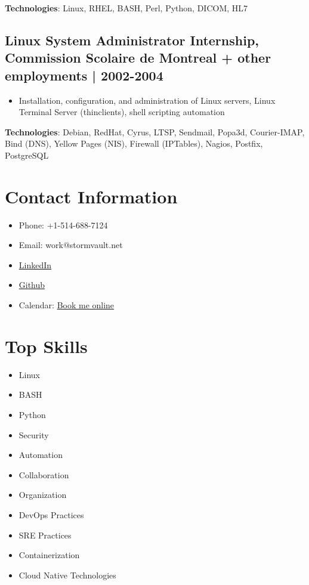 \documentclass[11pt,a4paper]{article}
\begin{document}
\textbf{Technologies}: Linux, RHEL, BASH, Perl, Python, DICOM, HL7
\subsection*{Linux System Administrator Internship, Commission Scolaire de Montreal + other employments | 2002-2004}
\label{sec:orge895621}
\begin{itemize}
\item Installation, configuration, and administration of Linux servers, Linux Terminal Server (thinclients), shell scripting automation
\end{itemize}

\textbf{Technologies}: Debian, RedHat, Cyrus, LTSP, Sendmail, Popa3d, Courier-IMAP, Bind (DNS), Yellow Pages (NIS), Firewall (IPTables), Nagios, Postfix, PostgreSQL
\section*{Contact Information}
\label{sec:orgf904c68}
\begin{itemize}
\item Phone: +1-514-688-7124
\item Email: work@stormvault.net
\item \href{https://www.linkedin.com/in/nicolascouture}{LinkedIn}
\item \href{https://github.com/ncouture}{Github}
\item Calendar: \href{https://calendar.app.google/WjxXaKGdbnXUkaf8A}{Book me online}
\end{itemize}
\section*{Top Skills}
\label{sec:orga6a629c}
\begin{itemize}
\item Linux
\item BASH
\item Python
\item Security
\item Automation
\item Collaboration
\item Organization
\item DevOps Practices
\item SRE Practices
\item Containerization
\item Cloud Native Technologies
\end{itemize}
\end{document}
